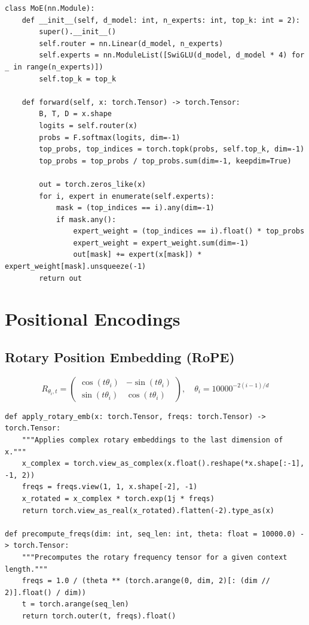 \begin{lstlisting}[style=pythonstyle, caption={Mixture of Experts (MoE) with top-k routing}, label=lst:moe]
class MoE(nn.Module):
    def __init__(self, d_model: int, n_experts: int, top_k: int = 2):
        super().__init__()
        self.router = nn.Linear(d_model, n_experts)
        self.experts = nn.ModuleList([SwiGLU(d_model, d_model * 4) for _ in range(n_experts)])
        self.top_k = top_k

    def forward(self, x: torch.Tensor) -> torch.Tensor:
        B, T, D = x.shape
        logits = self.router(x)
        probs = F.softmax(logits, dim=-1)
        top_probs, top_indices = torch.topk(probs, self.top_k, dim=-1)
        top_probs = top_probs / top_probs.sum(dim=-1, keepdim=True)
        
        out = torch.zeros_like(x)
        for i, expert in enumerate(self.experts):
            mask = (top_indices == i).any(dim=-1)
            if mask.any():
                expert_weight = (top_indices == i).float() * top_probs
                expert_weight = expert_weight.sum(dim=-1)
                out[mask] += expert(x[mask]) * expert_weight[mask].unsqueeze(-1)
        return out
\end{lstlisting}

\section{Positional Encodings}
\label{app:pos}

\subsection{Rotary Position Embedding (RoPE)}
\label{form:rope}

\[
  R_{\theta_i, t} = \begin{pmatrix} \cos(t\theta_i) & -\sin(t\theta_i) \\ \sin(t\theta_i) & \cos(t\theta_i) \end{pmatrix}, \quad \theta_i = 10000^{-2(i-1)/d}
\]

\begin{lstlisting}[style=pythonstyle, caption={Rotary positional embeddings (RoPE)}, label=lst:rope]
def apply_rotary_emb(x: torch.Tensor, freqs: torch.Tensor) -> torch.Tensor:
    """Applies complex rotary embeddings to the last dimension of x."""
    x_complex = torch.view_as_complex(x.float().reshape(*x.shape[:-1], -1, 2))
    freqs = freqs.view(1, 1, x.shape[-2], -1)
    x_rotated = x_complex * torch.exp(1j * freqs)
    return torch.view_as_real(x_rotated).flatten(-2).type_as(x)

def precompute_freqs(dim: int, seq_len: int, theta: float = 10000.0) -> torch.Tensor:
    """Precomputes the rotary frequency tensor for a given context length."""
    freqs = 1.0 / (theta ** (torch.arange(0, dim, 2)[: (dim // 2)].float() / dim))
    t = torch.arange(seq_len)
    return torch.outer(t, freqs).float()
\end{lstlisting}

